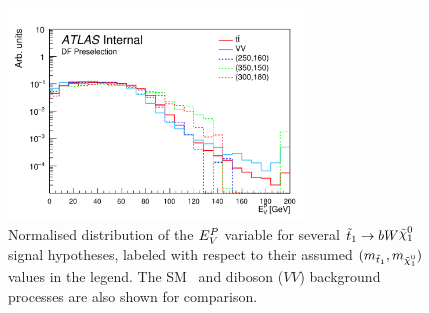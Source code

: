 \begin{figure}[!htb]
    \begin{center}
        \includegraphics[width=0.7\textwidth]{figures/search_stop2l/strategy/comp_plots/dfpresel_MDR}
        \caption{
            Normalised distribution of the $E_V^P$ variable for several $\stopone \rightarrow b W \ninoone$
            signal hypotheses, labeled with respect to their assumed $(m_{\stopone}, m_{\ninoone})$ values in the
            legend.
            The SM \ttbar~and diboson ($VV$) background processes are also shown for comparison.
        }
        \label{fig:rjr_MDR}
    \end{center}
\end{figure}

